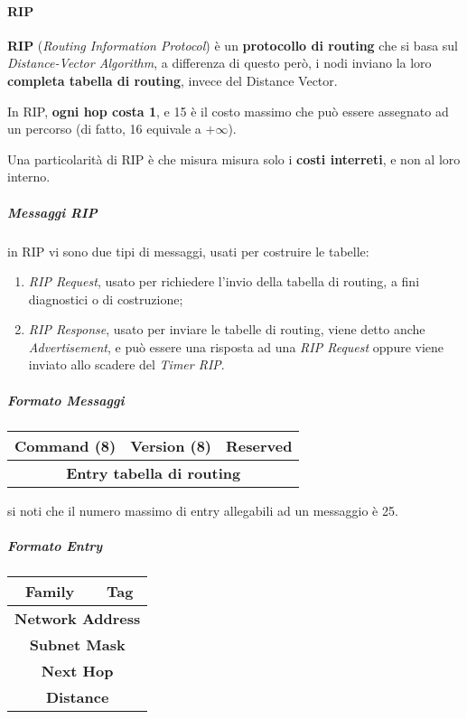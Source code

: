 \documentclass[a4paper]{article}
\begin{document}
			\paragraph{RIP}
				\textbf{RIP} (\emph{Routing Information Protocol}) è un \textbf{protocollo di routing} che si basa sul \emph{Distance-Vector Algorithm}, a differenza di questo però, i nodi inviano la loro \textbf{completa tabella di routing}, invece del Distance Vector.
				
				In RIP, \textbf{ogni hop costa 1}, e 15 è il costo massimo che può essere assegnato ad un percorso (di fatto, 16 equivale a $ +\infty $).
				
				Una particolarità di RIP è che misura misura solo i \textbf{costi interreti}, e non al loro interno.
					
				\subparagraph{Messaggi RIP}
					in RIP vi sono due tipi di messaggi, usati per costruire le tabelle:
					\begin{enumerate}
						\item \emph{RIP Request}, usato per richiedere l'invio della tabella di routing, a fini diagnostici o di costruzione;
						\item \emph{RIP Response}, usato per inviare le tabelle di routing, viene detto anche \emph{Advertisement}, e può essere una risposta ad una  \emph{RIP Request} oppure viene inviato allo scadere del \emph{Timer RIP}.
					\end{enumerate}
				
				\subparagraph{Formato Messaggi}
					\begin{center}
						\begin{tabular}{ccc}
						\textbf{Command} (8) & \textbf{Version} (8) & Reserved \\
						\hline
						\multicolumn{3}{c}{\textbf{Entry tabella di routing}} \\
						\end{tabular}
					\end{center}
					
					si noti che il numero massimo di entry allegabili ad un messaggio è 25.
					
				\subparagraph{Formato Entry}
					\begin{center}
						\begin{tabular}{cc}
							Family & Tag \\
							\hline
							\multicolumn{2}{c}{\textbf{Network Address}} \\
							\hline
							\multicolumn{2}{c}{\textbf{Subnet Mask}} \\
							\hline
							\multicolumn{2}{c}{\textbf{Next Hop}} \\
							\hline
							\multicolumn{2}{c}{\textbf{Distance}} \\
							\hline
						\end{tabular}
					\end{center}
					
\end{document}
